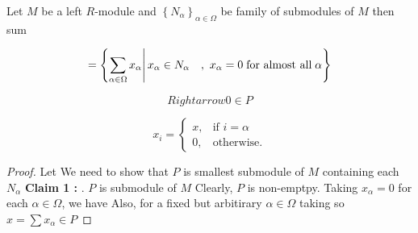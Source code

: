 \begin{prop}
    Let $M$ be a left $R$-module and $\left\lbrace N_\alpha\right\rbrace_{\alpha \in \Omega }$  be family of submodules of $M$ then sum  

\[
 = \left\lbrace \sum\limits_{\alpha \in \Omega } x_\alpha \middle\vert\, x_\alpha \in N_\alpha \quad , \ x_\alpha = 0 \; \textmd{for almost all} \; \alpha\right\rbrace 
\]

\[
Rightarrow0 \in P
\]

\[
x_i = \begin{cases}
                                 x, & \mbox{if } i =\alpha \\
                                 0, & \mbox{otherwise}.
                               \end{cases}
\]

\begin{proof}
      Let 
      We need to show that $P$ is smallest submodule of $M$ containing each $N_\alpha$
      \newline  \bigskip
      \textbf{Claim 1 :} .  \qquad $P$ is submodule of $M$  \newline Clearly, $P$ is non-emptpy. Taking $x_\alpha = 0$ for each $\alpha \in \Omega$, we have  Also, for a fixed but arbitirary $\alpha \in \Omega $ taking 
            so $x =\sum x_\alpha \in P$ 
       
\end{proof}
  
    
     
\end{prop}